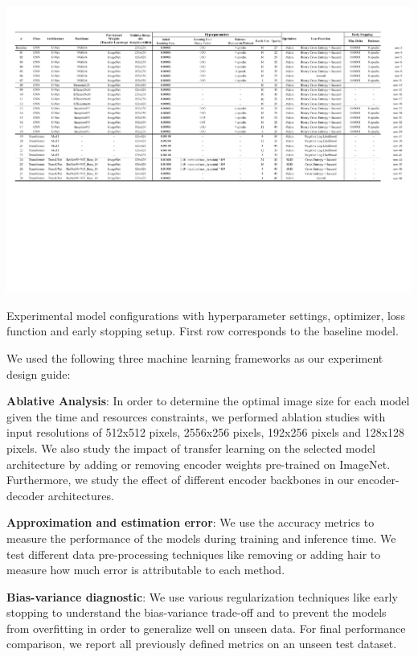 \begin{table}[ht]
  \centering
  \includegraphics[width=\textwidth]{assets/experiments.pdf}
  \caption[Experiments]{Experimental model configurations with hyperparameter settings, optimizer, loss function and early stopping setup. First row corresponds to the baseline model.}
  \label{table:experiments}
\end{table}

We used the following three machine learning frameworks as our experiment design guide:

\textbf{Ablative Analysis}: In order to determine the optimal image size for each model given the time and resources constraints, we performed ablation studies with input resolutions of 512x512 pixels, 2556x256 pixels, 192x256 pixels and 128x128 pixels. We also study the impact of transfer learning on the selected model architecture by adding or removing encoder weights pre-trained on ImageNet. Furthermore, we study the effect of different encoder backbones in our encoder-decoder architectures.

\textbf{Approximation and estimation error}: We use the accuracy metrics to measure the performance of the models during training and inference time. We test different data pre-processing techniques like removing or adding hair to measure how much error is attributable to each method.

\textbf{Bias-variance diagnostic}: We use various regularization techniques like early stopping to understand the bias-variance trade-off and to prevent the models from overfitting in order to generalize well on unseen data. For final performance comparison, we report all previously defined metrics on an unseen test dataset.


